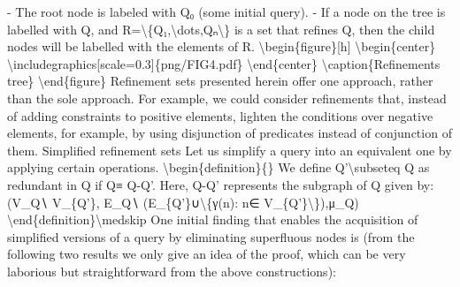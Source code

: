 \documentclass{article}%
\begin{document}
\newline%
{-} The root node is labeled with Q₀ (some initial query).\newline%
{-} If a node on the tree is labelled with Q, and R=\textbackslash{}\{Q₁,\textbackslash{}dots,Qₙ\textbackslash{}\} is a set that refines Q, then the child nodes will be labelled with the elements of R.\newline%
\newline%
\textbackslash{}begin\{figure\}{[}h{]}\newline%
\textbackslash{}begin\{center\}\newline%
\textbackslash{}includegraphics{[}scale=0.3{]}\{png/FIG4.pdf\}\newline%
\textbackslash{}end\{center\}\newline%
\textbackslash{}caption\{Refinements tree\}\newline%
\textbackslash{}end\{figure\}\newline%
\newline%
Refinement sets presented herein offer one approach, rather than the sole approach. For example, we could consider refinements that, instead of adding constraints to positive elements, lighten the conditions over negative elements, for example, by using disjunction of predicates instead of conjunction of them.\newline%
\newline%
Simplified refinement sets\newline%
\newline%
Let us simplify a query into an equivalent one by applying certain operations.\newline%
\newline%
\textbackslash{}begin\{definition\}\{\}\newline%
We define Q'\textbackslash{}subseteq Q as redundant in Q if Q≡ Q{-}Q'. Here, Q{-}Q' represents the subgraph of Q given by:\newline%
(V\_Q∖ V\_\{Q'\}, E\_Q∖ (E\_\{Q'\}∪\textbackslash{}\{γ(n): n∈ V\_\{Q'\}\textbackslash{}\}),μ\_Q)\newline%
\newline%
\textbackslash{}end\{definition\}\textbackslash{}medskip\newline%
\newline%
One initial finding that enables the acquisition of simplified versions of a query by eliminating superfluous nodes is (from the following two results we only give an idea of the proof, which can be very laborious but straightforward from the above constructions):\newline%
\end{document}
